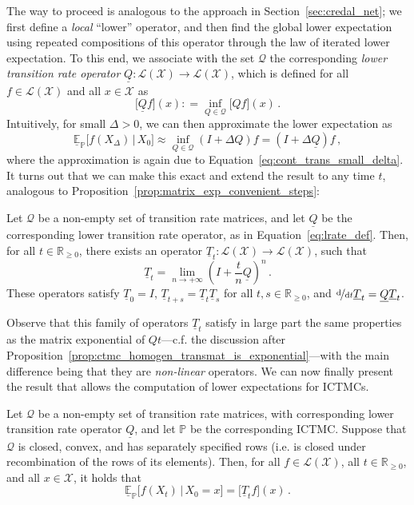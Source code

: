 \documentclass[graybox]{svmult}
\newcommand{\reals}{\mathbb{R}}
\newcommand{\realsnonneg}{\reals_{\geq 0}}
\newcommand{\states}{\mathcal{X}}
\newcommand{\gambles}{\mathcal{L}}
\newcommand{\gamblesX}{\gambles(\states)}
\newcommand{\coloneqq}{:\!=}
\begin{document}
The way to proceed is analogous to the approach in Section~\ref{sec:credal_net}; we first define a \emph{local} ``lower'' operator, and then find the global lower expectation using repeated compositions of this operator through the law of iterated lower expectation. To this end, we associate with the set $\mathcal{Q}$ the corresponding \emph{lower transition rate operator} $\underline{Q}:\gamblesX\to\gamblesX$, which is defined for all $f\in\gamblesX$ and all $x\in\states$ as
\begin{equation}\label{eq:lrate_def}
\bigl[\underline{Q}f\bigr](x) \coloneqq \inf_{Q\in\mathcal{Q}} \bigl[Qf\bigr](x)\,.
\end{equation}
Intuitively, for small $\Delta>0$, we can then approximate the lower expectation as
\begin{equation*}
\underline{\mathbb{E}}_\mathbb{P}\bigl[f(X_\Delta)\,\vert\,X_0\bigr] \approx \inf_{Q\in\mathcal{Q}} (I+\Delta Q)f = (I+\Delta\underline{Q})f\,,
\end{equation*}
where the approximation is again due to Equation~\eqref{eq:cont_trans_small_delta}. It turns out that we can make this exact and extend the result to any time $t$, analogous to Proposition~\ref{prop:matrix_exp_convenient_steps}:
\begin{theorem}\label{theo:continuous_trans_is_imprecise_exponential}
Let $\mathcal{Q}$ be a non-empty set of transition rate matrices, and let $\underline{Q}$ be the corresponding lower transition rate operator, as in Equation~\eqref{eq:lrate_def}. Then, for all $t\in\realsnonneg$, there exists an operator $\underline{T}_t:\gamblesX\to\gamblesX$, such that
\begin{equation*}
\underline{T}_t = \lim_{n\to+\infty}\left(I+\frac{t}{n}\underline{Q}\right)^n\,.
\end{equation*}
These operators satisfy $\underline{T}_0=I$, $\underline{T}_{t+s}=\underline{T}_t\underline{T}_s$ for all $t,s\in\realsnonneg$, and $\nicefrac{\mathrm{d}}{\mathrm{d}t}\underline{T}_t=\underline{Q}\underline{T}_t$. 
\end{theorem}
Observe that this family of operators $\underline{T}_t$ satisfy in large part the same properties as the matrix exponential of $Qt$---c.f. the discussion after Proposition~\ref{prop:ctmc_homogen_transmat_is_exponential}---with the main difference being that they are \emph{non-linear} operators. We can now finally present the result that allows the computation of lower expectations for ICTMCs.
\begin{theorem}\label{theo:lower_exp_is_lower_trans_ctmc}
Let $\mathcal{Q}$ be a non-empty set of transition rate matrices, with corresponding lower transition rate operator $\underline{Q}$, and let $\mathbb{P}$ be the corresponding ICTMC. Suppose that $\mathcal{Q}$ is closed, convex, and has separately specified rows (i.e. is closed under recombination of the rows of its elements). Then, for all $f\in\gamblesX$, all $t\in\realsnonneg$, and all $x\in\states$, it holds that
\begin{equation}\label{eq:lower_exp_is_lower_trans_ctmc}
\underline{\mathbb{E}}_\mathbb{P}\bigl[f(X_t)\,\vert\,X_0=x\bigr] = \bigl[\underline{T}_tf\bigr](x)\,.
\end{equation}
\end{theorem}
\end{document}
